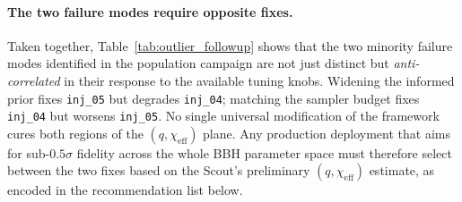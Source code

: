 \documentclass[12pt]{article}
\begin{document}
\paragraph{The two failure modes require opposite fixes.}
Taken together, Table~\ref{tab:outlier_followup} shows that the two minority failure modes identified in the population campaign are not just distinct but \emph{anti-correlated} in their response to the available tuning knobs. Widening the informed prior fixes \texttt{inj\_05} but degrades \texttt{inj\_04}; matching the sampler budget fixes \texttt{inj\_04} but worsens \texttt{inj\_05}. No single universal modification of the framework cures both regions of the $(q,\chi_{\mathrm{eff}})$ plane. Any production deployment that aims for sub-$0.5\sigma$ fidelity across the whole BBH parameter space must therefore select between the two fixes based on the Scout's preliminary $(q, \chi_{\mathrm{eff}})$ estimate, as encoded in the recommendation list below.
\end{document}
